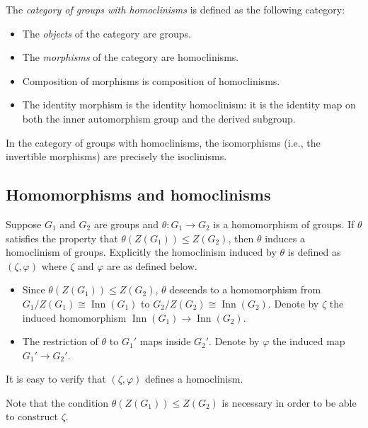 \begin{definer}
  The {\em category of groups with homoclinisms} is defined as the
  following category:

  \begin{itemize}
  \item The {\em objects} of the category are groups.
  \item The {\em morphisms} of the category are homoclinisms.
  \item Composition of morphisms is composition of homoclinisms.
  \item The identity morphism is the identity homoclinism: it is the
    identity map on both the inner automorphism group and the derived
    subgroup.
  \end{itemize}
\end{definer}

In the category of groups with homoclinisms, the isomorphisms (i.e.,
the invertible morphisms) are precisely the isoclinisms.

\subsection{Homomorphisms and homoclinisms}\label{sec:homomorphisms-and-homoclinisms}

Suppose $G_1$ and $G_2$ are groups and $\theta: G_1 \to G_2$ is a
homomorphism of groups. If $\theta$ satisfies the property that
$\theta(Z(G_1)) \le Z(G_2)$, then $\theta$ induces a homoclinism of
groups. Explicitly the homoclinism induced by $\theta$ is defined as
$(\zeta,\varphi)$ where $\zeta$ and $\varphi$ are as defined below.

\begin{itemize}
\item Since $\theta(Z(G_1)) \le Z(G_2)$, $\theta$ descends to a
  homomorphism from $G_1/Z(G_1) \cong \operatorname{Inn}(G_1)$ to
  $G_2/Z(G_2) \cong \operatorname{Inn}(G_2)$. Denote by $\zeta$ the
  induced homomorphism $\operatorname{Inn}(G_1) \to
  \operatorname{Inn}(G_2)$.
\item The restriction of $\theta$ to $G_1'$ maps inside $G_2'$. Denote
  by $\varphi$ the induced map $G_1' \to G_2'$.
\end{itemize}

It is easy to verify that $(\zeta,\varphi)$ defines a homoclinism.

Note that the condition $\theta(Z(G_1)) \le Z(G_2)$ is necessary in
order to be able to construct $\zeta$.

